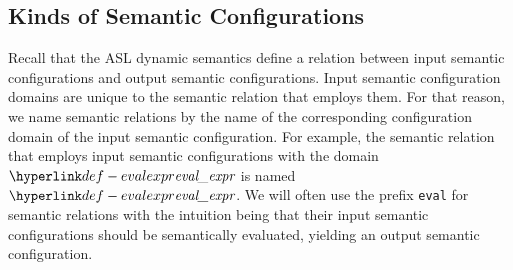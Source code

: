 \subsection{Kinds of Semantic Configurations\label{sec:KindsOfSemanticConfigurations}}

Recall that the ASL dynamic semantics define a relation between input semantic configurations and output semantic configurations.
Input semantic configuration domains are unique to the semantic relation that employs them.
For that reason, we name semantic relations by the name of the corresponding configuration domain of the input semantic configuration.
For example, the semantic relation that employs input semantic configurations with the domain $\evalexpr$
is named $\evalexpr$.
%
We will often use the prefix \texttt{eval} for semantic relations with the intuition being that their input semantic configurations
should be semantically evaluated, yielding an output semantic configuration.

